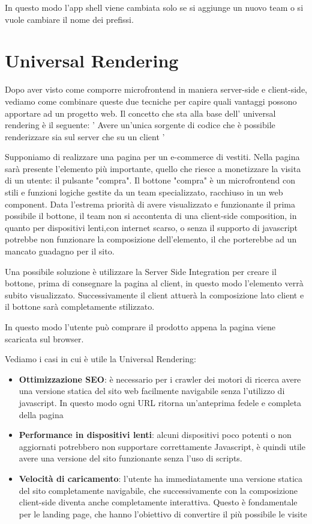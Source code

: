In questo modo l'app shell viene cambiata solo se si aggiunge un nuovo team o si vuole cambiare il nome dei prefissi.



\pagebreak
\section*{Universal Rendering}
Dopo aver visto come comporre microfrontend in maniera server-side e client-side, vediamo come combinare queste due tecniche
per capire quali vantaggi possono apportare ad un progetto web.
Il concetto che sta alla base dell' universal rendering è il seguente:
' Avere un'unica sorgente di codice che è possibile renderizzare sia sul server che su un client ' \cite{ssr}

Supponiamo di realizzare una pagina per un e-commerce di vestiti.
Nella pagina sarà presente l'elemento più importante, quello che riesce a monetizzare la visita di un utente: il pulsante "compra".
Il bottone "compra" è un microfrontend con stili e funzioni logiche gestite da un team specializzato, racchiuso in un web component.
Data l'estrema priorità di avere visualizzato e funzionante il prima possibile il bottone, il team non si accontenta di una client-side composition,
in quanto per dispositivi lenti,con internet scarso, o senza il supporto di javascript potrebbe non funzionare la composizione dell'elemento, 
il che porterebbe ad un mancato guadagno per il sito.

Una possibile soluzione è utilizzare la Server Side Integration per creare il bottone, prima di consegnare la pagina al client, in questo modo l'elemento 
verrà subito visualizzato. Successivamente il client attuerà la composizione lato client e il bottone sarà completamente stilizzato.

In questo modo l'utente può comprare il prodotto appena la pagina viene scaricata sul browser.

Vediamo i casi in cui è utile la Universal Rendering: \cite{angularUniversal}
\begin{itemize}
    \item \textbf{Ottimizzazione SEO}: è necessario per i crawler dei motori di ricerca avere una versione statica del sito web
    facilmente navigabile senza l'utilizzo di javascript. In questo modo ogni URL ritorna un'anteprima fedele e completa della pagina
    \item \textbf{Performance in dispositivi lenti}: alcuni dispositivi poco potenti o non aggiornati potrebbero non supportare correttamente
    Javascript, è quindi utile avere una versione del sito funzionante senza l'uso di scripts.
    \item \textbf{Velocità di caricamento}: l'utente ha immediatamente una versione statica del sito completamente navigabile, che successivamente
    con la composizione client-side diventa anche completamente interattiva. Questo è fondamentale per le landing page, che hanno l'obiettivo di convertire il più 
    possibile le visite
\end{itemize}


